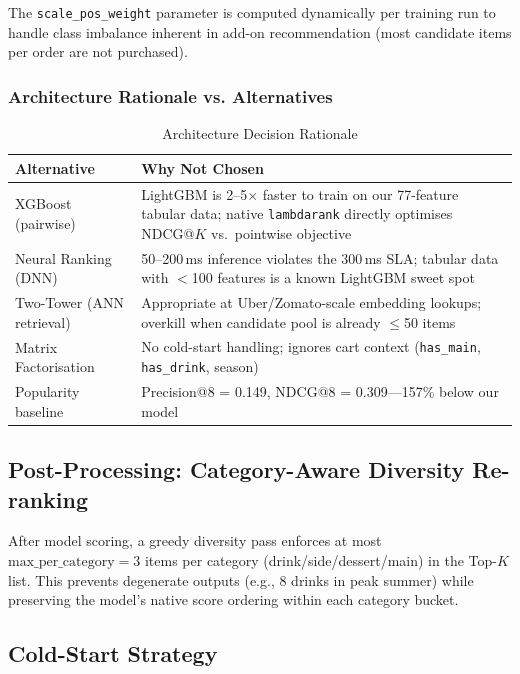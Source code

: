 \documentclass[conference]{IEEEtran}
\begin{document}
The \texttt{scale\_pos\_weight} parameter is computed dynamically per training
run to handle class imbalance inherent in add-on recommendation (most candidate
items per order are not purchased).

\subsubsection{Architecture Rationale vs. Alternatives}

\begin{table}[h]
\caption{Architecture Decision Rationale}
\centering
\begin{tabular}{p{1.8cm}p{5.5cm}}
\toprule
Alternative & Why Not Chosen \\
\midrule
XGBoost (pairwise) & LightGBM is 2--5$\times$ faster to train on our
  77-feature tabular data; native \texttt{lambdarank} directly optimises
  NDCG@$K$ vs.\ pointwise objective \\
\addlinespace
Neural Ranking (DNN) & 50--200\,ms inference violates the 300\,ms SLA;
  tabular data with $<$100 features is a known LightGBM sweet spot \\
\addlinespace
Two-Tower (ANN retrieval) & Appropriate at Uber/Zomato-scale embedding
  lookups; overkill when candidate pool is already $\leq$50 items \\
\addlinespace
Matrix Factorisation & No cold-start handling; ignores cart context
  (\texttt{has\_main}, \texttt{has\_drink}, season) \\
\addlinespace
Popularity baseline & Precision@8 = 0.149, NDCG@8 = 0.309---157\%
  below our model \\
\bottomrule
\end{tabular}
\end{table}

\subsection{Post-Processing: Category-Aware Diversity Re-ranking}

After model scoring, a greedy diversity pass enforces at most
$\text{max\_per\_category} = 3$ items per category
(drink/side/dessert/main) in the Top-$K$ list. This prevents degenerate
outputs (e.g., 8 drinks in peak summer) while preserving the model's native
score ordering within each category bucket.

\subsection{Cold-Start Strategy}
\end{document}
